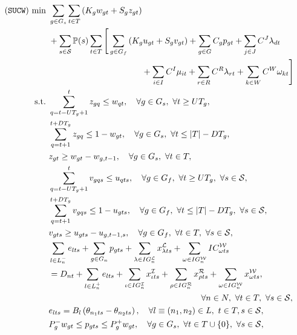 \begin{subequations} \label{sucw:formulation}
	\begin{align}
	(\texttt{SUCW})\ \textrm{min}\ &\sum_{g\in G_s}\sum_{t \in T}\left(K_g w_{gt}+S_g z_{gt}\right) \nonumber \\	&+ \sum_{s\in\mathcal{S}}\PP(s)\sum_{t\in T} 
	\Bigg[	 \sum_{g\in G_f} \left(K_g u_{gt}+S_g v_{gt}\right) + \sum_{g\in G}C_g p_{gt} + \sum_{j\in J} C^{J}\lambda_{dt} \nonumber \\&\qquad\qquad\qquad\qquad\qquad\quad  + \sum_{i\in I} C^{I}\mu_{it} + \sum_{r\in R} C^{R}\lambda_{rt} + \sum_{k\in W} C^{W}\omega_{kt} \Bigg]
	\label{sucw:obj}\\
	\textrm{s.t.}\ &  \sum_{q=t-UT_g+1}^t z_{gq}\le w_{qt},\quad\forall g\in G_s,\ \forall t\ge UT_g,	\label{sucw:b}\\
	&\sum_{q=t+1}^{t+DT_g} z_{gq}\le 1-w_{gt},\quad\forall g\in G_s,\ \forall t\le |T|-DT_g,\label{sucw:c}\\
	&z_{gt}\ge w_{gt}-w_{g,t-1},\quad\forall g\in G_s,\ \forall t\in T,\label{sucw:d}\\
	&  \sum_{q=t-UT_g+1}^t v_{gqs}\le u_{qts},\quad\forall g\in G_f,\ \forall t\ge UT_g,\ \forall s\in\mathcal{S},\label{sucw:e}\\
	&\sum_{q=t+1}^{t+DT_g} v_{gqs}\le 1-u_{gts},\quad\forall g\in G_f,\ \forall t\le |T|-DT_g,\ \forall s\in\mathcal{S},\label{sucw:f}\\
	&v_{gts}\ge u_{gts}-u_{g,t-1,s},\quad\forall g\in G_f,\ \forall t\in T,\ \forall s\in\mathcal{S},\label{sucw:g}\\
	&\sum_{l\in L_n^-}e_{lts}+\sum_{g\in G_n} p_{gts}+\sum_{\lambda\in IG_n^\mathcal{L}}x_{\lambda ts}^\mathcal{L} +\sum_{\omega\in IG_n^\mathcal{W}} IC_{\omega ts}^\mathcal{W} \nonumber \\ 
	&= D_{nt}+\sum_{l\in L_n^+}e_{lts}+\sum_{\iota\in IG_n^\mathcal{I}}x_{\iota ts}^\mathcal{I} + \sum_{\rho\in IG_n^\mathcal{R}} x_{\rho ts}^\mathcal{R} +\sum_{\omega\in IG_n^\mathcal{W}} x_{\omega ts}^\mathcal{W}, \nonumber \\
	&\qquad\qquad\qquad\qquad\qquad\qquad\qquad\qquad\qquad\forall n\in N,\ \forall t\in T,\ \forall s\in\mathcal{S},\label{sucw:h}\\
	&e_{lts}=B_l\left(  \theta_{n_1 ts}-\theta_{n_2 ts}  \right),\quad\forall l\equiv (n_1, n_2)\in L,\ t\in T, s\in\mathcal{S},\label{sucw:i}\\
	&P_g^- w_{gt} \le p_{gts} \le P_g^+ w_{gt},\quad\forall g\in G_s,\ \forall t\in T\cup\{0\},\ \forall s\in\mathcal{S},\label{sucw:j}\\

\end{align}
\end{subequations}
